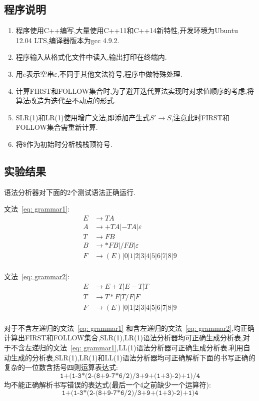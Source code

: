 \documentclass[11pt]{article}
\begin{document}
\subsection{程序说明}
\begin{enumerate}
\item 程序使用C++编写,大量使用C++11和C++14新特性,开发环境为Ubuntu 12.04 LTS,编译器版本为gcc 4.9.2.
\item 程序输入从格式化文件中读入,输出打印在终端内.
\item 用$e$表示空串$\varepsilon$,不同于其他文法符号,程序中做特殊处理.
\item 计算FIRST和FOLLOW集合时,为了避开迭代算法实现时对求值顺序的考虑,将算法改造为迭代至不动点的形式.
\item SLR(1)和LR(1)使用增广文法,即添加产生式$S' \rightarrow S$,注意此时FIRST和FOLLOW集合需重新计算.
\item 将$\$$作为初始时分析栈栈顶符号.
\end{enumerate}

\subsection{实验结果}
语法分析器对下面的2个测试语法正确运行.

文法~\ref{eq: grammar1}:
\begin{equation}
\begin{aligned} \label{eq: grammar1}
E &\rightarrow TA \\
A &\rightarrow +TA|-TA|\varepsilon \\
T &\rightarrow FB \\
B &\rightarrow *FB|/FB|\varepsilon \\
F &\rightarrow (E)|0|1|2|3|4|5|6|7|8|9 \\
\end{aligned}
\end{equation}

文法~\ref{eq: grammar2}:
\begin{equation} \label{eq: grammar2}
\begin{aligned}
E &\rightarrow E+T|E-T|T \\
T &\rightarrow T*F|T/F|F \\
F &\rightarrow (E)|0|1|2|3|4|5|6|7|8|9 \\
\end{aligned}
\end{equation}

对于不含左递归的文法~\ref{eq: grammar1} 和含左递归的文法~\ref{eq: grammar2},均正确计算出FIRST和FOLLOW集合,SLR(1),LR(1)语法分析器均可正确生成分析表,对于不含左递归的文法~\ref{eq: grammar1},LL(1)语法分析器可正确生成分析表.利用自动生成的分析表,SLR(1),LR(1)和LL(1)语法分析器均可正确解析下面的书写正确的复杂的一位数含括号四则运算表达式:
\[ \texttt{1+(1-3*(2-(8+9-7*6/2)/3+9+(1+3)-2)+1)/4} \]
均不能正确解析书写错误的表达式(最后一个4之前缺少一个运算符):
\[ \texttt{1+(1-3*(2-(8+9-7*6/2)/3+9+(1+3)-2)+1)4} \]
\end{document}
